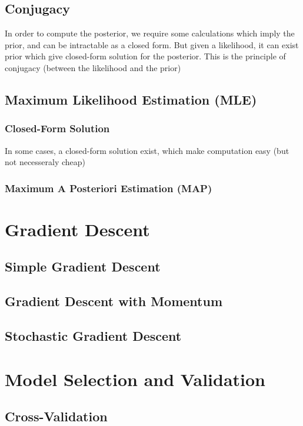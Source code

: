 	\subsection{Conjugacy} %
	\label{sub:conjugacy}
		In order to compute the posterior, we require some calculations which imply the prior, and can be intractable as a closed form. But given a likelihood, it can exist prior which give closed-form solution for the posterior. This is the principle of conjugacy (between the likelihood and the prior)
	\subsection{Maximum Likelihood Estimation (MLE)}

		\subsubsection*{Closed-Form Solution}

			In some cases, a closed-form solution exist, which make computation easy (but not necesseraly cheap)
	\subsubsection{Maximum A Posteriori Estimation (MAP)}

\section{Gradient Descent}

	\subsection{Simple Gradient Descent}

	\subsection{Gradient Descent with Momentum}

	\subsection{Stochastic Gradient Descent}


\section{Model Selection and Validation}

	\subsection{Cross-Validation}

